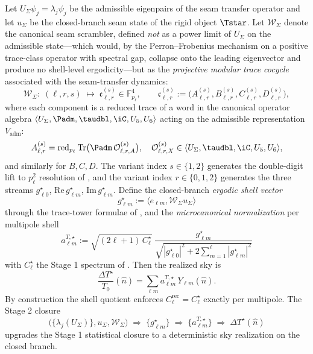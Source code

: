 \begin{conjecture}
\label{thm:cmb_seam_phase_realization}
Let $U_\Sigma\psi_j=\lambda_j\psi_j$ be the admissible eigenpairs of the seam transfer operator
and let $u_\Sigma$ be the closed-branch seam state of the rigid object $\Tstar$.  Let
$\mathcal W_\Sigma$ denote the canonical seam scrambler, defined \emph{not} as a power limit of
$U_\Sigma$ on the admissible state---which would, by the Perron--Frobenius mechanism on a positive
trace-class operator with spectral gap, collapse onto the leading eigenvector and produce no
shell-level ergodicity---but as the
\emph{projective modular trace cocycle} associated with the seam-transfer dynamics:
\[
\mathcal W_\Sigma:\;
(\ell,r,s)\;\longmapsto\;\mathfrak c_{\ell,r}^{(s)}\in\mathbb F_{p_\ell}^4,
\qquad
\mathfrak c_{\ell,r}^{(s)}
:=
\bigl(A_{\ell,r}^{(s)},B_{\ell,r}^{(s)},C_{\ell,r}^{(s)},D_{\ell,r}^{(s)}\bigr),
\]
where each component is a reduced trace of a word in the canonical operator algebra
\(
\langle U_\Sigma,\Padm,\taudbl,\iC,U_5,U_6\rangle
\)
acting on the admissible representation $V_{\mathrm{adm}}$:
\[
A_{\ell,r}^{(s)}=
\operatorname{red}_{p_\ell}
\operatorname{Tr}\bigl(\Padm\,\mathcal O_{\ell,r,A}^{(s)}\bigr),
\quad
\mathcal O_{\ell,r,X}^{(s)}\in\langle U_\Sigma,\taudbl,\iC,U_5,U_6\rangle,
\]
and similarly for $B,C,D$. The variant index $s\in\{1,2\}$ generates the
double-digit lift to $p_\ell^2$ resolution of , and the variant
index $r\in\{0,1,2\}$ generates the three streams $g_{\ell 0}^\star$,
$\mathrm{Re}\,g_{\ell m}^\star$, $\mathrm{Im}\,g_{\ell m}^\star$. Define the closed-branch
\emph{ergodic shell vector}
\[
g_{\ell m}^{\star}
:=
\langle e_{\ell m},\mathcal W_\Sigma u_\Sigma\rangle
\]
through the trace-tower formulae of , and the
\emph{microcanonical normalization} per multipole shell
\[
\boxed{\;
a_{\ell m}^{T,\star}
:=
\sqrt{(2\ell+1)\,C_\ell^\star}\;
\frac{g_{\ell m}^{\star}}{\sqrt{|g_{\ell 0}^{\star}|^2
+2\sum_{m=1}^{\ell}|g_{\ell m}^{\star}|^2}}\;}
\]
with $C_\ell^\star$ the Stage 1 spectrum of
.  Then the realized sky is
\[
\frac{\Delta T^\star}{T_0}(\hat n)
=
\sum_{\ell m}a_{\ell m}^{T,\star}\,Y_{\ell m}(\hat n).
\]
By construction the shell quotient enforces
$C_\ell^{\mathrm{rec}}=C_\ell^\star$ exactly per multipole. The Stage 2 closure
\[
\bigl(\{\lambda_j(U_\Sigma)\},u_\Sigma,\mathcal W_\Sigma\bigr)
\;\Longrightarrow\;
\{g_{\ell m}^{\star}\}
\;\Longrightarrow\;
\{a_{\ell m}^{T,\star}\}
\;\Longrightarrow\;
\Delta T^\star(\hat n)
\]
upgrades the Stage 1 statistical closure to a deterministic sky realization on the closed branch.
\end{conjecture}

